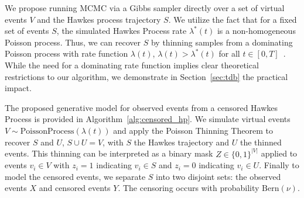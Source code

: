 \documentclass[11pt]{article}
\newcommand{\algrule}[1][.2pt]{\par\vskip.5\baselineskip\hrule height #1\par\vskip.5\baselineskip}
\begin{document}
We propose running MCMC via a Gibbs sampler directly over a set of virtual events $V$ and the Hawkes process trajectory $S$. We utilize the fact that for a fixed set of events $S$, the simulated Hawkes Process rate $\lambda^*(t)$ is a non-homogeneous Poisson process. Thus, we can recover $S$ by thinning samples from a dominating Poisson process with rate function $\lambda(t)$, $\lambda(t) > \lambda^*(t)$ for all $t \in [0,T]$~\cite{pthin}. While the need for a dominating rate function implies clear theoretical restrictions to our algorithm, we demonstrate in Section~\ref{sec:tdb} the practical impact.

The proposed generative model for observed events from a censored Hawkes Process is provided in Algorithm~\ref{alg:censored_hp}. We simulate virtual events $V\sim \text{PoissonProcess}(\lambda(t))$ and apply the Poisson Thinning Theorem to recover $S$ and $U$, $S \cup U = V$, with $S$ the Hawkes trajectory and $U$ the thinned events. This thinning can be interpreted as a binary mask $Z \in \{0,1\}^{|V|}$ applied to events $v_i \in V$ with $z_i = 1$ indicating $v_i \in S$ and $z_i = 0$ indicating $v_i \in U$. Finally to model the censored events, we separate $S$ into two disjoint sets: the observed events $X$ and censored events $Y$. The censoring occurs with probability $\text{Bern}(\nu)$. %

\end{document}
